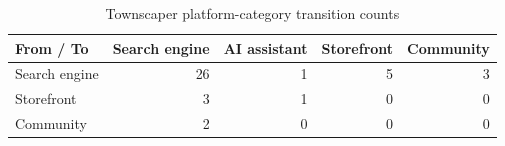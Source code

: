 \begin{table}[t]
\centering
\caption{Townscaper platform-category transition counts}
\label{tab:rq8-platform-transitions}
\begin{tabular}{lrrrr}
\toprule
From / To & Search engine & AI assistant & Storefront & Community \\
\midrule
Search engine & 26 & 1 & 5 & 3 \\
Storefront & 3 & 1 & 0 & 0 \\
Community & 2 & 0 & 0 & 0 \\
\bottomrule
\end{tabular}
\end{table}

